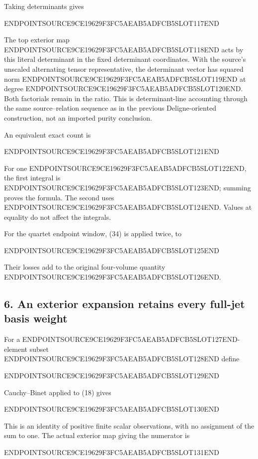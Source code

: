 Taking determinants gives

ENDPOINTSOURCE9CE19629F3FC5AEAB5ADFCB5SLOT117END

The top exterior map ENDPOINTSOURCE9CE19629F3FC5AEAB5ADFCB5SLOT118END acts by this literal determinant in the fixed determinant coordinates. With the source's unscaled alternating tensor representative, the determinant vector has squared norm ENDPOINTSOURCE9CE19629F3FC5AEAB5ADFCB5SLOT119END at degree ENDPOINTSOURCE9CE19629F3FC5AEAB5ADFCB5SLOT120END. Both factorials remain in the ratio. This is determinant-line accounting through the same source--relation sequence as in the previous Deligne-oriented construction, not an imported purity conclusion.

An equivalent exact count is

ENDPOINTSOURCE9CE19629F3FC5AEAB5ADFCB5SLOT121END

For one ENDPOINTSOURCE9CE19629F3FC5AEAB5ADFCB5SLOT122END, the first integral is ENDPOINTSOURCE9CE19629F3FC5AEAB5ADFCB5SLOT123END; summing proves the formula. The second uses ENDPOINTSOURCE9CE19629F3FC5AEAB5ADFCB5SLOT124END. Values at equality do not affect the integrals.

For the quartet endpoint window, (34) is applied twice, to

ENDPOINTSOURCE9CE19629F3FC5AEAB5ADFCB5SLOT125END

Their losses add to the original four-volume quantity ENDPOINTSOURCE9CE19629F3FC5AEAB5ADFCB5SLOT126END.

\subsection{6. An exterior expansion retains every full-jet basis weight}\label{endpoint-restriction_original--an-exterior-expansion-retains-every-full-jet-basis-weight}

For a ENDPOINTSOURCE9CE19629F3FC5AEAB5ADFCB5SLOT127END-element subset ENDPOINTSOURCE9CE19629F3FC5AEAB5ADFCB5SLOT128END define

ENDPOINTSOURCE9CE19629F3FC5AEAB5ADFCB5SLOT129END

Cauchy--Binet applied to (18) gives

ENDPOINTSOURCE9CE19629F3FC5AEAB5ADFCB5SLOT130END

This is an identity of positive finite scalar observations, with no assignment of the sum to one. The actual exterior map giving the numerator is

ENDPOINTSOURCE9CE19629F3FC5AEAB5ADFCB5SLOT131END

